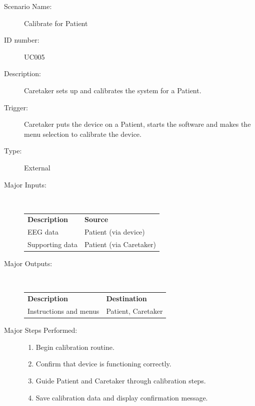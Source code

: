 \documentclass{article}
\begin{document}
\begin{description}
    \item[Scenario Name:] Calibrate for Patient
    \item[ID number:] UC005
    \item[Description:] Caretaker sets up and calibrates the system for a Patient.
    \item[Trigger:] Caretaker puts the device on a Patient, starts the
        software and makes the menu selection to calibrate the device.
    \item[Type:] External
    \item[Major Inputs:] \hfill \\
        \begin{tabular}{l l}
            \textbf{Description} & \textbf{Source} \\
            EEG data & Patient (via device) \\
            Supporting data & Patient (via Caretaker) \\
        \end{tabular}
    \item[Major Outputs:] \hfill \\
        \begin{tabular}{l l}
            \textbf{Description} & \textbf{Destination} \\
            Instructions and menus & Patient, Caretaker \\
        \end{tabular}
    \item[Major Steps Performed:] \hfill
        \begin{enumerate}
            \item Begin calibration routine.
            \item Confirm that device is functioning correctly.
            \item Guide Patient and Caretaker through calibration steps.
            \item Save calibration data and display confirmation message.
        \end{enumerate}
\end{description}

\hfill \\
\end{document}
